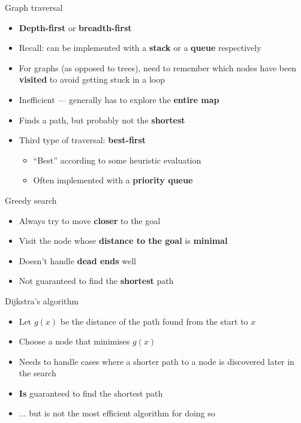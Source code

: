 \begin{frame}{Graph traversal}
	\begin{itemize}
		\pause\item \textbf{Depth-first} or \textbf{breadth-first}
		\pause\item Recall: can be implemented with a \textbf{stack} or a \textbf{queue} respectively
		\pause\item For graphs (as opposed to trees), need to remember which nodes have been \textbf{visited}
			to avoid getting stuck in a loop
		\pause\item Inefficient --- generally has to explore the \textbf{entire map}
		\pause\item Finds a path, but probably not the \textbf{shortest}
		\pause\item Third type of traversal: \textbf{best-first}
			\begin{itemize}
				\pause\item ``Best'' according to some heuristic evaluation
				\pause\item Often implemented with a \textbf{priority queue}
			\end{itemize}
	\end{itemize}
\end{frame}

\begin{frame}{Greedy search}
	\begin{itemize}
		\pause\item Always try to move \textbf{closer} to the goal
		\pause\item Visit the node whose \textbf{distance to the goal} is \textbf{minimal}
		\pause\item Doesn't handle \textbf{dead ends} well
		\pause\item Not guaranteed to find the \textbf{shortest} path
	\end{itemize}
\end{frame}

\begin{frame}{Dijkstra's algorithm}
	\begin{itemize}
		\pause\item Let $g(x)$ be the distance of the path found from the start to $x$
		\pause\item Choose a node that minimises $g(x)$
		\pause\item Needs to handle cases where a shorter path to a node is discovered later in the search
		\pause\item \textbf{Is} guaranteed to find the shortest path
		\pause\item ... but is not the most efficient algorithm for doing so
	\end{itemize}
\end{frame}


